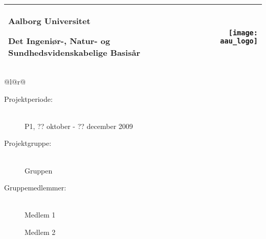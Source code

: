 \newlength{\realparindent}
\newlength{\realparskip}
\setlength{\realparindent}{\parindent}
\setlength{\realparskip}{\parskip}

\begin{titlepage}
\begin{nopagebreak}
{
\begin{center}
    \samepage
    \begin{tabular*}{\textwidth}{@{} l @{\extracolsep{\fill}}r@{}}
        \parbox[b]{11cm}{
            {\LARGE Aalborg Universitet}
            
            {\large Det Ingeniør-, Natur- og Sundhedsvidenskabelige Basisår}
        }
        & \texttt{[image: aau\_logo]} \\
        \hline
    \end{tabular*}
    \vspace{0.4cm}

    \begin{tabular*}{\textwidth}{@{}l@{\extracolsep{\fill}}r@{}}
        \\
        \begin{minipage}[t]{0.49\textwidth}
            \begin{description}
                \item[Projektperiode:]~\\
                P1, ?? oktober - ?? december 2009
                \vspace{0.2cm}

                \item[Projektgruppe:]~\\
                Gruppen
                  
                \item[Gruppemedlemmer:]~\\
                Medlem 1 

                Medlem 2


\end{description}
\end{minipage}
\end{tabular*}
\end{center}}
\end{nopagebreak}
\end{titlepage}
